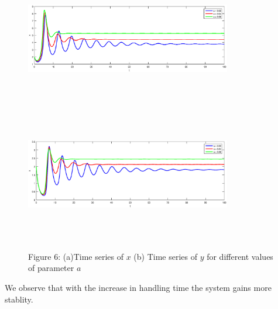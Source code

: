 \documentclass[a4paper, 10pt]{article}
\begin{document}
\begin{figure}[H]
	{\includegraphics[width=9cm, height=6cm]{13a.eps}}
	\endminipage\hfill
	{\includegraphics[width=9cm, height=6cm]{13b.eps}}
	\endminipage\hfill
	\begin{center} Figure 6: (a)Time series of $x$  (b) Time series of $y$  for different values of parameter $a$   \end{center}
\end{figure}
We observe that with the increase in handling time the system gains more stablity.
\end{document}

